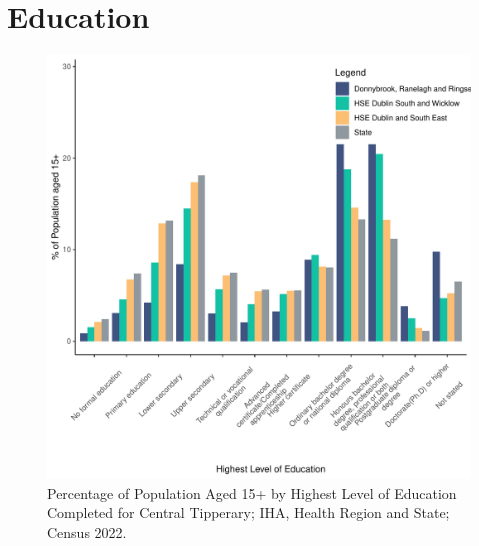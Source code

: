 \documentclass{article}
\begin{document}
\section{Education}\label{sect:Edu}
\begin{figure}[H]
	\centering
	\includegraphics[width = 120mm]{../figures/EduED.pdf}
	\caption{Percentage of Population Aged 15+ by Highest Level of Education Completed for Central Tipperary; IHA, Health Region and State; Census 2022.}
	\label{fig:vbnv}
	\end{figure}
\end{document}
